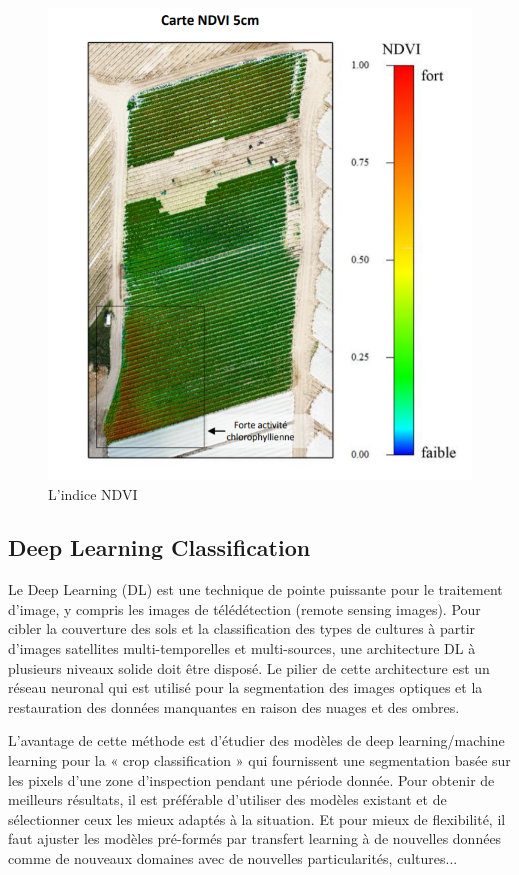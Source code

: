 \documentclass[12pt, openany]{report}
\begin{document}
\begin{figure}[H]
\centering
\includegraphics[scale=0.7]{ndvi.png}
\caption{L'indice NDVI}
\end{figure}



\subsection{Deep Learning Classification}
Le Deep Learning (DL) est une technique de pointe puissante pour le traitement d'image, y compris les images de télédétection (remote sensing images). 
Pour cibler la couverture des sols et la classification des types de cultures à partir d'images satellites multi-temporelles et multi-sources, une architecture DL à plusieurs niveaux solide doit être disposé. 
Le pilier de cette architecture est un réseau neuronal qui est utilisé pour la segmentation des images optiques et la restauration des données manquantes en raison des nuages et des ombres. \cite{deeplearning}

L’avantage de cette méthode est d’étudier des modèles de deep learning/machine learning pour la « crop classification » qui fournissent une segmentation basée sur les pixels d'une zone d'inspection pendant une période donnée. Pour obtenir de meilleurs résultats, il est préférable d’utiliser des modèles existant et de sélectionner ceux les mieux adaptés à la situation. Et pour mieux de flexibilité, il faut ajuster les modèles pré-formés par transfert learning à de nouvelles données comme de nouveaux domaines avec de nouvelles particularités, cultures...
\end{document}
